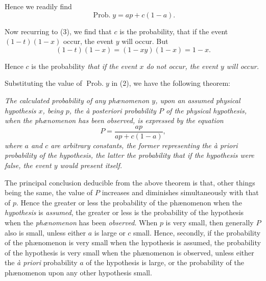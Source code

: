 \documentclass[oneside]{book}
\begin{document}
Hence we readily find
\begin{equation}\tag{4}
\operatorname{Prob. } y = ap + c (1-a).
\end{equation}

Now recurring to (3), we find that $c$ is the probability, that if
the event $(1-t) (1-x)$ occur, the event $y$ will occur. But
\begin{equation*}
(1-t)(1-x)=(1-xy)(1-x)=1-x.
\end{equation*}

Hence $c$ is the probability \emph{that if the event $x$ do not occur,
the event $y$ will occur.}

Substituting the value of $\operatorname{Prob. } y$ in (2), we have the
following theorem:

\emph{The calculated probability of any ph\ae nomenon $y$, upon an
assumed physical hypothesis $x$, being $p$, the \textit{\`{a} posteriori} probability $P$
of the physical hypothesis, when the ph\ae nomenon has been observed,
is expressed by the equation}
\begin{equation}\tag{5}
P=\frac{ap}{ap+c(1-a)},
\end{equation}
\emph{where $a$ and $c$ are arbitrary constants, the former representing the
\textit{\`{a} priori} probability of the hypothesis, the latter the probability that
if the hypothesis were false, the event $y$ would present itself.}

The principal conclusion deducible from the above theorem
is that, other things being the same, the value of $P$ increases and
diminishes simultaneously with that of $p$. Hence the greater or
less the probability of the ph\ae nomenon when the \emph{hypothesis} is
\emph{assumed}, the greater or less is the probability of the hypothesis
when the \emph{ph\ae nomenon} has been \emph{observed}. When $p$ is very small,
then generally $P$ also is small, unless either $a$ is large or $c$ small.
Hence, secondly, if the probability of the ph{\ae}nomenon is very
small when the hypothesis is assumed, the probability of the hypothesis is very small when the ph{\ae}nomenon is observed, unless
either the \textit{\`{a} priori} probability $a$ of the hypothesis is large, or the
probability of the ph{\ae}nomenon upon any other hypothesis small.
\end{document}
